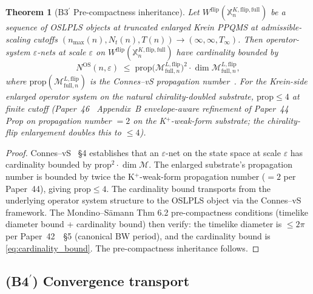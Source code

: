 \documentclass[11pt,a4paper]{article}
\theoremstyle{plain}
\newtheorem{theorem}{Theorem}[section]
\theoremstyle{definition}
\newcommand{\nmax}{n_{\max}}
\newcommand{\Nt}{N_{t}}
\newcommand{\Mcal}{\mathcal{M}}
\newcommand{\Wflip}{W^{\mathrm{flip}}}
\newcommand{\osXkrein}{\mathbb{X}^{K,\mathrm{flip},\mathrm{full}}}
\begin{document}
\begin{theorem}[B3$^{\prime}$ Pre-compactness inheritance]
\label{thm:b3prime}
Let $\Wflip(\osXkrein_{n})$ be a sequence of OSLPLS objects at
truncated enlarged Krein PPQMS at admissible-scaling cutoffs
$(\nmax(n),\Nt(n),T(n))\to(\infty,\infty,T_{\infty})$. Then
operator-system $\varepsilon$-nets at scale $\varepsilon$ on
$\Wflip(\osXkrein_{n})$ have cardinality bounded by
\begin{equation}
  N^{\mathrm{OS}}(n,\varepsilon) \;\le\; \mathrm{prop}\!\big(\Mcal^{L,\mathrm{flip}}_{\mathrm{full},n}\big)^{2}\cdot\dim\Mcal^{L,\mathrm{flip}}_{\mathrm{full},n},
  \label{eq:cardinality_bound}
\end{equation}
where $\mathrm{prop}(\Mcal^{L,\mathrm{flip}}_{\mathrm{full},n})$ is
the Connes--vS propagation number~\cite{connes_vs2021}. For the
Krein-side enlarged operator system on the natural chirality-doubled
substrate, $\mathrm{prop}\le 4$ at finite cutoff (Paper~46~\cite{paper46}
Appendix~B envelope-aware refinement of Paper~44~\cite{paper44}
Prop on propagation number $=2$ on the K$^{+}$-weak-form substrate;
the chirality-flip enlargement doubles this to $\le 4$).
\end{theorem}

\begin{proof}
Connes--vS~\cite{connes_vs2021} \S 4 establishes that an
$\varepsilon$-net on the state space at scale $\varepsilon$ has
cardinality bounded by $\mathrm{prop}^{2}\cdot\dim\Mcal$. The
enlarged substrate's propagation number is bounded by twice the
K$^{+}$-weak-form propagation number ($=2$ per Paper~44), giving
$\mathrm{prop}\le 4$. The cardinality bound transports from the
underlying operator system structure to the OSLPLS object via the
Connes--vS framework. The Mondino--S\"amann Thm 6.2 pre-compactness
conditions (timelike diameter bound + cardinality bound) then verify:
the timelike diameter is $\le 2\pi$ per Paper~42~\cite{paper42}~\S 5
(canonical BW period), and the cardinality bound is
\eqref{eq:cardinality_bound}. The pre-compactness inheritance
follows.
\end{proof}

\subsection{(B4$^{\prime}$) Convergence transport}
\label{sec:b4prime}
\end{document}
